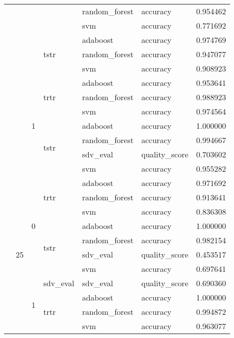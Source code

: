 \begin{longtable}{llllllr}
\cline{5-7}
 &  &  &  & random_forest & accuracy & 0.954462 \\
\cline{5-7}
 &  &  &  & svm & accuracy & 0.771692 \\
\cline{4-7} \cline{5-7}
 &  &  & \multirow[t]{3}{*}{tstr} & adaboost & accuracy & 0.974769 \\
\cline{5-7}
 &  &  &  & random_forest & accuracy & 0.947077 \\
\cline{5-7}
 &  &  &  & svm & accuracy & 0.908923 \\
\cline{3-7} \cline{4-7} \cline{5-7}
 &  & \multirow[t]{7}{*}{1} & \multirow[t]{3}{*}{trtr} & adaboost & accuracy & 0.953641 \\
\cline{5-7}
 &  &  &  & random_forest & accuracy & 0.988923 \\
\cline{5-7}
 &  &  &  & svm & accuracy & 0.974564 \\
\cline{4-7} \cline{5-7}
 &  &  & \multirow[t]{4}{*}{tstr} & adaboost & accuracy & 1.000000 \\
\cline{5-7}
 &  &  &  & random_forest & accuracy & 0.994667 \\
\cline{5-7}
 &  &  &  & sdv_eval & quality_score & 0.703602 \\
\cline{5-7}
 &  &  &  & svm & accuracy & 0.955282 \\
\cline{2-7} \cline{3-7} \cline{4-7} \cline{5-7}
 & \multirow[t]{14}{*}{25} & \multirow[t]{7}{*}{0} & \multirow[t]{3}{*}{trtr} & adaboost & accuracy & 0.971692 \\
\cline{5-7}
 &  &  &  & random_forest & accuracy & 0.913641 \\
\cline{5-7}
 &  &  &  & svm & accuracy & 0.836308 \\
\cline{4-7} \cline{5-7}
 &  &  & \multirow[t]{4}{*}{tstr} & adaboost & accuracy & 1.000000 \\
\cline{5-7}
 &  &  &  & random_forest & accuracy & 0.982154 \\
\cline{5-7}
 &  &  &  & sdv_eval & quality_score & 0.453517 \\
\cline{5-7}
 &  &  &  & svm & accuracy & 0.697641 \\
\cline{3-7} \cline{4-7} \cline{5-7}
 &  & \multirow[t]{7}{*}{1} & sdv_eval & sdv_eval & quality_score & 0.690360 \\
\cline{4-7} \cline{5-7}
 &  &  & \multirow[t]{3}{*}{trtr} & adaboost & accuracy & 1.000000 \\
\cline{5-7}
 &  &  &  & random_forest & accuracy & 0.994872 \\
\cline{5-7}
 &  &  &  & svm & accuracy & 0.963077 \\

\end{longtable}
